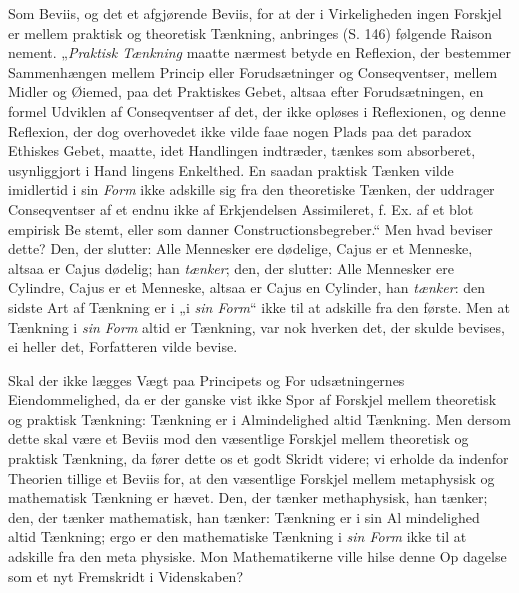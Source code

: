 \documentclass[12pt]{book}
\newcommand{\opage}[1]{\marginnote{\footnotesize\textit{[#1]}}}
\begin{document}
Som Beviis, og det et afgjørende Beviis, for at der
i Virkeligheden ingen Forskjel er mellem praktisk og
theoretisk Tænkning, anbringes (S. 146) følgende Raison\-%
\opage{24}\setcounter{footnote}{0}%
nement. „\emph{Praktisk Tænkning} maatte nærmest betyde
en Reflexion, der bestemmer Sammenhængen mellem
Princip eller Forudsætninger og Conseqventser, mellem
Midler og Øiemed, paa det Praktiskes Gebet, altsaa efter
Forudsætningen, en formel Udviklen af Conseqventser af
det, der ikke opløses i Reflexionen, og denne Reflexion,
der dog overhovedet ikke vilde faae nogen Plads paa
det paradox Ethiskes Gebet, maatte, idet Handlingen
indtræder, tænkes som absorberet, usynliggjort i Hand\-%
lingens Enkelthed. En saadan praktisk Tænken vilde
imidlertid i sin \emph{Form} ikke adskille sig fra den theoretiske
Tænken, der uddrager Conseqventser af et endnu ikke af
Erkjendelsen Assimileret, f. Ex. af et blot empirisk Be\-%
stemt, eller som danner Constructionsbegreber.“ Men
hvad beviser dette? Den, der slutter: Alle Mennesker
ere dødelige, Cajus er et Menneske, altsaa er Cajus
dødelig; han \emph{tænker}; den, der slutter: Alle Mennesker
ere Cylindre, Cajus er et Menneske, altsaa er Cajus en
Cylinder, han \emph{tænker}: den sidste Art af Tænkning er i
„i \emph{sin Form}“ ikke til at adskille fra den første. Men
at Tænkning i \emph{sin Form} altid er Tænkning, var nok
hverken det, der skulde bevises, ei heller det, Forfatteren
vilde bevise.

Skal der ikke lægges Vægt paa Principets og For\-%
udsætningernes Eiendommelighed, da er der ganske vist
ikke Spor af Forskjel mellem theoretisk og praktisk
Tænkning: Tænkning er i Almindelighed altid Tænkning.
Men dersom dette skal være et Beviis mod den væsentlige
Forskjel mellem theoretisk og praktisk Tænkning, da fører
dette os et godt Skridt videre; vi erholde da indenfor
Theorien tillige et Beviis for, at den væsentlige Forskjel
mellem metaphysisk og mathematisk Tænkning er hævet.
Den, der tænker methaphysisk, han tænker; den, der
tænker mathematisk, han tænker: Tænkning er i sin Al\-%
\opage{25}\setcounter{footnote}{0}%
mindelighed altid Tænkning; ergo er den mathematiske
Tænkning i \emph{sin Form} ikke til at adskille fra den meta\-%
physiske. Mon Mathematikerne ville hilse denne Op\-%
dagelse som et nyt Fremskridt i Videnskaben?
\end{document}
